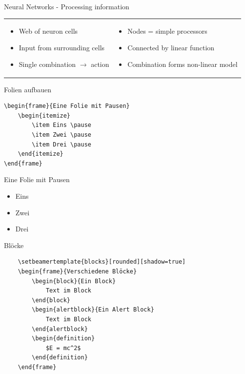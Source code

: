 \documentclass{beamer}
\begin{document}
\begin{frame}{Neural Networks - Processing information}
\begin{tabular}{p{5cm}|p{5cm}}
\begin{itemize}
            \item Web of neuron cells
            \item Input from surrounding cells
            \item Single combination $\rightarrow$ action
        \end{itemize}
        & 
        \begin{itemize}
          \item Nodes = simple processors
          \item Connected by linear function
          \item Combination forms non-linear model
        \end{itemize} 
     \end{tabular}
    \end{frame}

\begin{frame}[containsverbatim]{Folien aufbauen}
\begin{lstlisting}
\begin{frame}{Eine Folie mit Pausen}
    \begin{itemize}
        \item Eins \pause
        \item Zwei \pause
        \item Drei \pause
    \end{itemize}
\end{frame}
\end{lstlisting}
\end{frame}

\begin{frame}{Eine Folie mit Pausen}
    \begin{itemize}
        \item Eins \pause
        \item Zwei \pause
        \item Drei 
    \end{itemize}
\end{frame}

\begin{frame}[containsverbatim]{Blöcke}
    \begin{lstlisting}
    \setbeamertemplate{blocks}[rounded][shadow=true]
    \begin{frame}{Verschiedene Blöcke}
        \begin{block}{Ein Block}
            Text im Block
        \end{block}
        \begin{alertblock}{Ein Alert Block}
            Text im Block
        \end{alertblock}
        \begin{definition}
            $E = mc^2$
        \end{definition}
    \end{frame}
    \end{lstlisting}
\end{frame}
\end{document}
